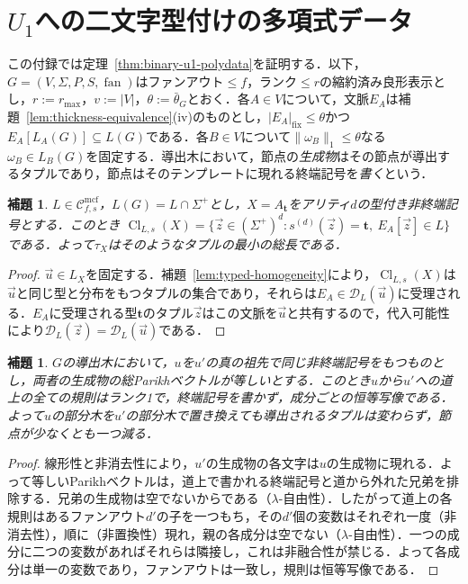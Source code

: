 \documentclass[11pt,a4paper]{ltjsarticle}
\numberwithin{equation}{section}
\theoremstyle{plain}
\newtheorem{lemma}[theorem]{補題}
\theoremstyle{definition}
\theoremstyle{remark}
\newcommand{\Cmcf}[2]{\mathcal{C}^{\mathrm{mcf}}_{#1,#2}}
\newcommand{\D}{\mathcal{D}}
\newcommand{\tuple}[1]{\vec{#1}}
\newcommand{\fan}{\operatorname{fan}}
\begin{document}
\section{$U_1$への二文字型付けの多項式データ}
\label{app:binary-u1}

この付録では定理~\ref{thm:binary-u1-polydata}を証明する．以下，$G=(V,\Sigma,P,S,\fan)$はファンアウト$\le f$，ランク$\le r$の縮約済み良形表示とし，$r:=r_{\max}$，$v:=|V|$，$\theta:=\bar\theta_G$とおく．各$A\in V$について，文脈$E_A$は補題~\ref{lem:thickness-equivalence}(iv)のものとし，$|E_A|_{\mathrm{fix}}\le\theta$かつ$E_A[L_A(G)]\subseteq L(G)$である．各$B\in V$について$\|\omega_B\|_1\le\theta$なる$\omega_B\in L_B(G)$を固定する．導出木において，節点の\emph{生成物}はその節点が導出するタプルであり，節点はそのテンプレートに現れる終端記号を\emph{書く}という．

\begin{lemma}\label{lem:app-u1-fillers}
$L\in\Cmcf{f}{s}$，$L(G)=L\cap\Sigma^+$とし，$X=A_{\mathbf t}$をアリティ$d$の型付き非終端記号とする．このとき
$\operatorname{Cl}_{L,s}(X)=\{\tuple z\in(\Sigma^+)^d:s^{(d)}(\tuple z)=\mathbf t,\
E_A[\tuple z]\in L\}$である．よって$\tau_X$はそのようなタプルの最小の総長である．
\end{lemma}

\begin{proof}
$\tuple u\in L_X$を固定する．補題~\ref{lem:typed-homogeneity}により，$\operatorname{Cl}_{L,s}(X)$は$\tuple u$と同じ型と分布をもつタプルの集合であり，それらは$E_A\in\D_L(\tuple u)$に受理される．$E_A$に受理される型$\mathbf t$のタプル$\tuple z$はこの文脈を$\tuple u$と共有するので，代入可能性により$\D_L(\tuple z)=\D_L(\tuple u)$である．
\end{proof}

\begin{lemma}\label{lem:app-u1-identity}
$G$の導出木において，$u$を$u'$の真の祖先で同じ非終端記号をもつものとし，両者の生成物の総Parikhベクトルが等しいとする．このとき$u$から$u'$への道上の全ての規則はランク1で，終端記号を書かず，成分ごとの恒等写像である．よって$u$の部分木を$u'$の部分木で置き換えても導出されるタプルは変わらず，節点が少なくとも一つ減る．
\end{lemma}

\begin{proof}
線形性と非消去性により，$u'$の生成物の各文字は$u$の生成物に現れる．よって等しいParikhベクトルは，道上で書かれる終端記号と道から外れた兄弟を排除する．兄弟の生成物は空でないからである（$\lambda$-自由性）．したがって道上の各規則はあるファンアウト$d'$の子を一つもち，その$d'$個の変数はそれぞれ一度（非消去性），順に（非置換性）現れ，親の各成分は空でない（$\lambda$-自由性）．一つの成分に二つの変数があればそれらは隣接し，これは非融合性が禁じる．よって各成分は単一の変数であり，ファンアウトは一致し，規則は恒等写像である．
\end{proof}
\end{document}
